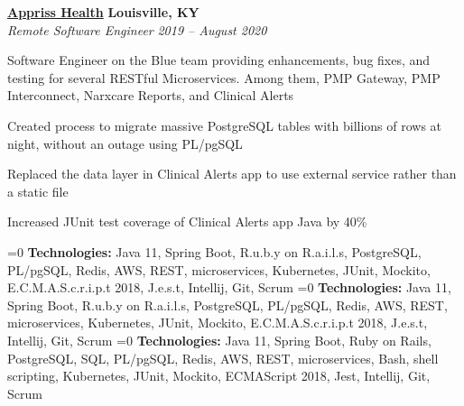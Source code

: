 %
    \headerrow
        {\textbf{\href{https://apprisshealth.com/}{Appriss Health}}}
        {\textbf{Louisville, KY}}
    \\
    \headerrow
        {\emph{Remote Software Engineer}}
        {\emph{2019 -- August 2020}}
    \begin{itemize*}
        \item Software Engineer on the Blue team providing enhancements, bug fixes, and testing for several RESTful Microservices.
            Among them, PMP Gateway, PMP Interconnect, Narxcare Reports, and Clinical Alerts
        \item Created process to migrate massive PostgreSQL tables with billions of rows at night, without an outage using PL/pgSQL
        \item Replaced the data layer in Clinical Alerts app to use external service rather than a static file
        \item Increased JUnit test coverage of Clinical Alerts app Java by 40\%
    \end{itemize*}

    \ifnum{}=0
    \hspace{1.0em}
        {\textbf{Technologies:} Java 11, Spring Boot, R.u.b.y on R.a.i.l.s, PostgreSQL, PL/pgSQL, Redis, AWS,
        REST, microservices, Kubernetes, JUnit, Mockito, E.C.M.A.S.c.r.i.p.t 2018, J.e.s.t, Intellij, Git, Scrum}
    \fi
    \ifnum{}=0
    \hspace{1.0em}
        {\textbf{Technologies:} Java 11, Spring Boot, R.u.b.y on R.a.i.l.s, PostgreSQL, PL/pgSQL, Redis, AWS,
        REST, microservices, Kubernetes, JUnit, Mockito, E.C.M.A.S.c.r.i.p.t 2018, J.e.s.t, Intellij, Git, Scrum}
    \fi
    \ifnum{}=0
    \hspace{1.0em}
        {\textbf{Technologies:} Java 11, Spring Boot, Ruby on Rails, PostgreSQL, SQL, PL/pgSQL, Redis, AWS,
        REST, microservices, Bash, shell scripting, Kubernetes, JUnit, Mockito, ECMAScript 2018, Jest, Intellij, Git, Scrum}
    \fi



